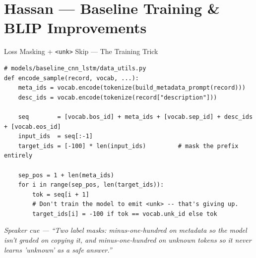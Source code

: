 \documentclass[10pt, aspectratio=169]{beamer}
\newcommand{\speakercue}[1]{%
  \vfill
  {\footnotesize\itshape\color{gray}Speaker cue --- #1}%
}
\begin{document}
\section*{Hassan --- Baseline Training \& BLIP Improvements}

\begin{frame}[fragile]{Loss Masking + \texttt{<unk>} Skip --- The Training Trick}
  \begin{lstlisting}
# models/baseline_cnn_lstm/data_utils.py
def encode_sample(record, vocab, ...):
    meta_ids = vocab.encode(tokenize(build_metadata_prompt(record)))
    desc_ids = vocab.encode(tokenize(record["description"]))

    seq        = [vocab.bos_id] + meta_ids + [vocab.sep_id] + desc_ids + [vocab.eos_id]
    input_ids  = seq[:-1]
    target_ids = [-100] * len(input_ids)         # mask the prefix entirely

    sep_pos = 1 + len(meta_ids)
    for i in range(sep_pos, len(target_ids)):
        tok = seq[i + 1]
        # Don't train the model to emit <unk> -- that's giving up.
        target_ids[i] = -100 if tok == vocab.unk_id else tok
  \end{lstlisting}
  \speakercue{``Two label masks: minus-one-hundred on metadata so the model
  isn't graded on copying it, and minus-one-hundred on unknown tokens so it
  never learns 'unknown' as a safe answer.''}
\end{frame}
\end{document}
